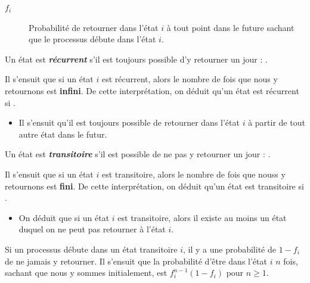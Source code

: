 \documentclass[french]{article}
\begin{document}
\begin{multicols*}{2}
\begin{distributions}[Notation]
\begin{description}
	\item[$f_{i}$]	Probabilité de retourner dans l'état $i$ à tout point dans le future sachant que le processus débute dans l'état $i$.
\end{description}
\end{distributions}

\begin{definitionNOHFILLprop}
Un état est \textbf{\textit{récurrent}} s'il est toujours possible d'y retourner un jour : . 

\bigskip

Il s'ensuit que si un état $i$ est récurrent, alors le nombre de fois que nous y retournons est \textbf{infini}. De cette interprétation, on déduit qu'un état est récurrent si .

\begin{itemize}
	\item	Il s'ensuit qu'il est toujours possible de retourner dans l'état $i$ à partir de tout autre état dans le futur.
\end{itemize}	
\end{definitionNOHFILLprop}

\begin{definitionNOHFILLprop}
Un état est \textit{\textbf{transitoire}} s'il est possible de ne pas y retourner un jour : .

\bigskip

Il s'ensuit que si un état $i$ est transitoire, alors le nombre de fois que nouss y retournons est \textbf{fini}. De cette interprétation, on déduit qu'un état est transitoire si .

\begin{itemize}
	\item	On déduit que si un état $i$ est transitoire, alors il existe au moins un état duquel on ne peut pas retourner à l'état $i$. 
\end{itemize}

\begin{definitionNOHFILLpropos}
Si un processus débute dans un état transitoire $i$, il y a une probabilité de $1 - f_{i}$ de ne jamais y retourner. Il s'ensuit que la probabilité d'être dans l'état $i$ $n$ fois, sachant que nous y sommes initialement, est $f_{i}^{n - 1}(1 - f_{i})$ pour $n \geq 1$.	


\end{definitionNOHFILLpropos}
\end{definitionNOHFILLprop}
\end{multicols*}
\end{document}
